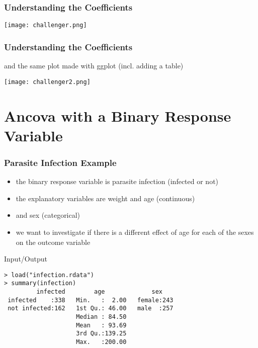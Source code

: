 \begin{frame}[fragile]\frametitle{Understanding the Coefficients}\footnotesize
\begin{center}
\texttt{[image: challenger.png]}
\end{center}
\end{frame}

\begin{frame}[fragile]\frametitle{Understanding the Coefficients}
and the same plot made with ggplot (incl. adding a table)
\begin{center}
\texttt{[image: challenger2.png]}
\end{center}
\end{frame}


\section[Binomial Ancova]{Ancova with a Binary Response Variable }

\begin{frame}[fragile]\frametitle{Parasite Infection Example}
\begin{itemize}
\item the binary response variable is parasite infection (infected or not) 
\item the explanatory variables are weight and age (continuous) 
\item and sex (categorical)
\item we want to investigate if there is a different effect of age for each of the sexes on the outcome variable
\end{itemize}
\begin{exampleblock}{Input/Output}\footnotesize
\begin{verbatim}
> load("infection.rdata")
> summary(infection)
         infected        age             sex     
 infected    :338   Min.   :  2.00   female:243  
 not infected:162   1st Qu.: 46.00   male  :257  
                    Median : 84.50               
                    Mean   : 93.69               
                    3rd Qu.:139.25               
                    Max.   :200.00               
\end{verbatim}
\end{exampleblock}

\end{frame}


